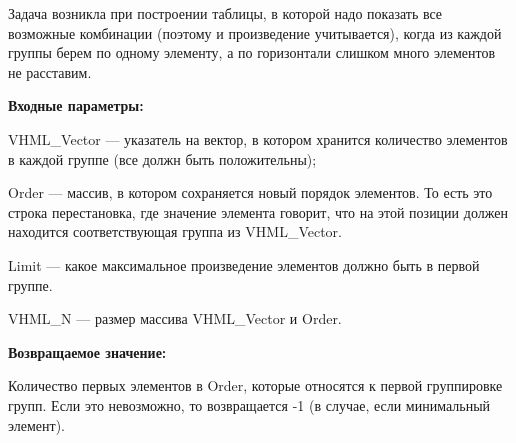 Задача возникла при построении таблицы, в которой надо показать все возможные комбинации (поэтому и произведение учитывается), когда из каждой группы берем по одному элементу, а по горизонтали слишком много элементов не расставим.

\textbf{Входные параметры:}  
 
VHML\_Vector --- указатель на вектор, в котором хранится количество элементов в каждой группе (все должн быть положительны);
 
Order --- массив, в котором сохраняется новый порядок элементов. То есть это строка перестановка, где значение элемента говорит, что на этой позиции должен находится соответствующая группа из VHML\_Vector.
 
Limit --- какое максимальное произведение элементов должно быть в первой группе.
 
VHML\_N --- размер массива VHML\_Vector и Order.
 
\textbf{Возвращаемое значение:}

Количество первых элементов в Order, которые относятся к первой группировке групп. Если это невозможно, то возвращается -1 (в случае, если минимальный элемент).
